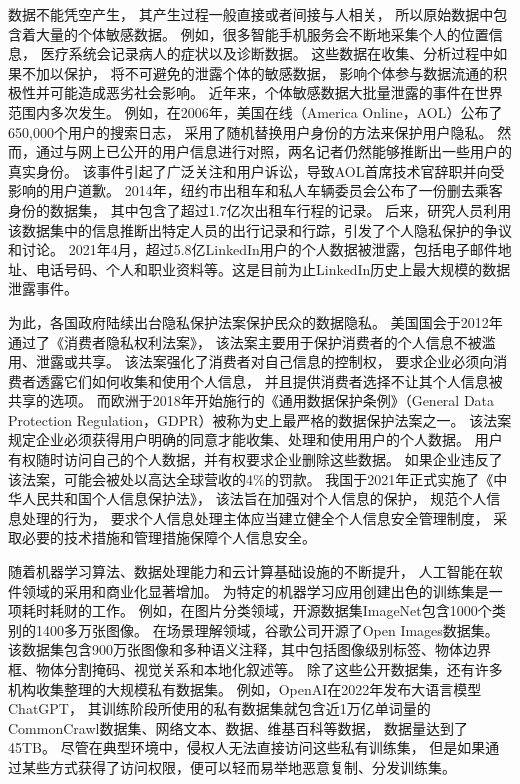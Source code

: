 数据不能凭空产生，
其产生过程一般直接或者间接与人相关，
所以原始数据中包含着大量的个体敏感数据。
例如，很多智能手机服务会不断地采集个人的位置信息，
医疗系统会记录病人的症状以及诊断数据。
这些数据在收集、分析过程中如果不加以保护，
将不可避免的泄露个体的敏感数据，
影响个体参与数据流通的积极性并可能造成恶劣社会影响。
近年来，个体敏感数据大批量泄露的事件在世界范围内多次发生。
例如，在2006年，美国在线（America Online，AOL）公布了650,000个用户的搜索日志，
采用了随机替换用户身份的方法来保护用户隐私。
然而，通过与网上已公开的用户信息进行对照，两名记者仍然能够推断出一些用户的真实身份。
该事件引起了广泛关注和用户诉讼，导致AOL首席技术官辞职并向受影响的用户道歉。
2014年，纽约市出租车和私人车辆委员会公布了一份删去乘客身份的数据集，
其中包含了超过1.7亿次出租车行程的记录。
后来，研究人员利用该数据集中的信息推断出特定人员的出行记录和行踪，引发了个人隐私保护的争议和讨论。
2021年4月，超过5.8亿LinkedIn用户的个人数据被泄露，包括电子邮件地址、电话号码、个人和职业资料等。这是目前为止LinkedIn历史上最大规模的数据泄露事件。

为此，各国政府陆续出台隐私保护法案保护民众的数据隐私。
美国国会于2012年通过了《消费者隐私权利法案》，
该法案主要用于保护消费者的个人信息不被滥用、泄露或共享。
该法案强化了消费者对自己信息的控制权，
要求企业必须向消费者透露它们如何收集和使用个人信息，
并且提供消费者选择不让其个人信息被共享的选项。
而欧洲于2018年开始施行的《通用数据保护条例》（General Data Protection Regulation，GDPR）被称为史上最严格的数据保护法案之一。
该法案规定企业必须获得用户明确的同意才能收集、处理和使用用户的个人数据。
用户有权随时访问自己的个人数据，并有权要求企业删除这些数据。
如果企业违反了该法案，可能会被处以高达全球营收的4\%的罚款。
我国于2021年正式实施了《中华人民共和国个人信息保护法》，
该法旨在加强对个人信息的保护，
规范个人信息处理的行为，
要求个人信息处理主体应当建立健全个人信息安全管理制度，
采取必要的技术措施和管理措施保障个人信息安全。

随着机器学习算法、数据处理能力和云计算基础设施的不断提升，
人工智能在软件领域的采用和商业化显著增加\cite{Gartner2022}。
为特定的机器学习应用创建出色的训练集是一项耗时耗财的工作。
例如，在图片分类领域，开源数据集ImageNet包含1000个类别的1400多万张图像\cite{}。
在场景理解领域，谷歌公司开源了Open Images数据集。
该数据集包含900万张图像和多种语义注释，其中包括图像级别标签、物体边界框、物体分割掩码、视觉关系和本地化叙述等。
除了这些公开数据集，还有许多机构收集整理的大规模私有数据集。
例如，OpenAI在2022年发布大语言模型ChatGPT，
其训练阶段所使用的私有数据集就包含近1万亿单词量的CommonCrawl数据集、网络文本、数据、维基百科等数据，
数据量达到了45TB\cite{DBLP:conf/nips/BrownMRSKDNSSAA20}。
尽管在典型环境中，侵权人无法直接访问这些私有训练集，
但是如果通过某些方式获得了访问权限，便可以轻而易举地恶意复制、分发训练集。

